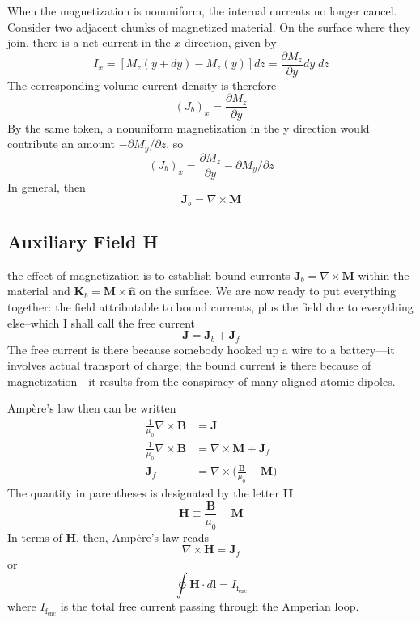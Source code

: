 \documentclass[../../../main.tex]{subfiles}
\begin{document}
When the magnetization is nonuniform, the internal currents no longer cancel. Consider two adjacent chunks of magnetized material. On the surface where they join, there is a net current in the $x$ direction, given by
\begin{equation*}
    I_x = [M_z(y + dy) - M_z(y)] dz=\frac{\partial M_z}{\partial y} dy\;dz
\end{equation*}
The corresponding volume current density is therefore
\begin{equation*}
    (J_b)_x =\frac{\partial M_z}{\partial y} 
\end{equation*}
By the same token, a nonuniform magnetization in the y direction would contribute an amount $-\partial M_y/\partial z$, so
\begin{equation*}
    (J_b)_x =\frac{\partial M_z}{\partial y} -\partial M_y/\partial z
\end{equation*}
In general, then
\begin{equation*}
    \mathbf{J}_b=\nabla \times \mathbf{M}
\end{equation*}

\subsection*{Auxiliary Field H}
the effect of magnetization is to establish bound currents $ \mathbf{J}_b=\nabla \times \mathbf{M}$ within the material and $ \mathbf{K}_b=  \mathbf{M}\times\mathbf{\hat{n}}$ on the surface. We are now ready to put everything together: the ﬁeld attributable to bound currents, plus the ﬁeld due to everything else--which I shall call the free current
\begin{equation*}
    \mathbf{J}=\mathbf{J}_b+\mathbf{J}_f
\end{equation*}
The free current is there because somebody hooked up a wire to a battery—it involves actual transport of charge; the bound current is there because of magnetization—it results from the conspiracy of many aligned atomic dipoles.

Ampère’s law then can be written
\begin{align*}
    \frac{1}{\mu_0}\nabla\times \mathbf{B}&=\mathbf{J}\\
    \frac{1}{\mu_0}\nabla\times \mathbf{B}&=\nabla \times \mathbf{M}+\mathbf{J}_f\\
    \mathbf{J}_f&=\nabla\times\bigg(\frac{\mathbf{B}}{\mu_0}-\mathbf{M}\bigg)
\end{align*}
The quantity in parentheses is designated by the letter \textbf{H}
\begin{equation*}
    \mathbf{H}\equiv\frac{\mathbf{B}}{\mu_0}-\mathbf{M}
\end{equation*}
In terms of \textbf{H}, then, Ampère’s law reads
\begin{equation*}
    \nabla\times\mathbf{H}=\mathbf{J}_f
\end{equation*}
or
\begin{equation*}
    \oint \mathbf{H}\cdot d\mathbf{l}=I_{\text{f}_\text{enc}}
\end{equation*}
where $I_{\text{f}_\text{enc}}$ is the total free current passing through the Amperian loop.
\end{document}
